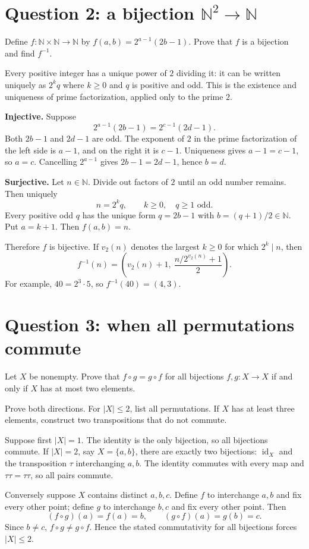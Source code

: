 \documentclass[11pt,openany]{book}
\newcommand{\N}{\mathbb N}\newcommand{\Z}{\mathbb Z}
\newcommand{\id}{\operatorname{id}}\newcommand{\Sym}{\operatorname{Sym}}
\begin{document}
\section{Question 2: a bijection $\N^2\to\N$}
\begin{questionbox}
Define $f:\N\times\N\to\N$ by $f(a,b)=2^{a-1}(2b-1)$. Prove that $f$ is a bijection and find $f^{-1}$.
\end{questionbox}
\begin{approachbox}
Every positive integer has a unique power of $2$ dividing it: it can be written uniquely as $2^kq$ where $k\ge0$ and $q$ is positive and odd. This is the existence and uniqueness of prime factorization, applied only to the prime $2$.
\end{approachbox}
\begin{solutionbox}
\textbf{Injective.} Suppose
\[
2^{a-1}(2b-1)=2^{c-1}(2d-1).
\]
Both $2b-1$ and $2d-1$ are odd. The exponent of $2$ in the prime factorization of the left side is $a-1$, and on the right it is $c-1$. Uniqueness gives $a-1=c-1$, so $a=c$. Cancelling $2^{a-1}$ gives $2b-1=2d-1$, hence $b=d$.

\textbf{Surjective.} Let $n\in\N$. Divide out factors of $2$ until an odd number remains. Then uniquely
\[
n=2^kq,\qquad k\ge0,\quad q\ge1\text{ odd}.
\]
Every positive odd $q$ has the unique form $q=2b-1$ with $b=(q+1)/2\in\N$. Put $a=k+1$. Then $f(a,b)=n$.

Therefore $f$ is bijective. If $v_2(n)$ denotes the largest $k\ge0$ for which $2^k\mid n$, then
\[
f^{-1}(n)=\left(v_2(n)+1,\ \frac{n/2^{v_2(n)}+1}{2}\right).
\]
For example, $40=2^3\cdot5$, so $f^{-1}(40)=(4,3)$.
\end{solutionbox}

\section{Question 3: when all permutations commute}
\begin{questionbox}
Let $X$ be nonempty. Prove that $f\circ g=g\circ f$ for all bijections $f,g:X\to X$ if and only if $X$ has at most two elements.
\end{questionbox}
\begin{approachbox}
Prove both directions. For $|X|\le2$, list all permutations. If $X$ has at least three elements, construct two transpositions that do not commute.
\end{approachbox}
\begin{solutionbox}
Suppose first $|X|=1$. The identity is the only bijection, so all bijections commute. If $|X|=2$, say $X=\{a,b\}$, there are exactly two bijections: $\id_X$ and the transposition $\tau$ interchanging $a,b$. The identity commutes with every map and $\tau\tau=\tau\tau$, so all pairs commute.

Conversely suppose $X$ contains distinct $a,b,c$. Define $f$ to interchange $a,b$ and fix every other point; define $g$ to interchange $b,c$ and fix every other point. Then
\[
(f\circ g)(a)=f(a)=b,
\qquad
(g\circ f)(a)=g(b)=c.
\]
Since $b\ne c$, $f\circ g\ne g\circ f$. Hence the stated commutativity for all bijections forces $|X|\le2$.
\end{solutionbox}
\end{document}
